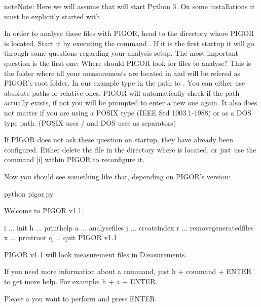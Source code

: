\documentclass[letterpaper,10pt,english]{sphinxmanual}
\begin{document}
\begin{sphinxadmonition}{note}{Note:}
Here we will assume that  will start Python 3. On some installations it must be explicitly started with .
\end{sphinxadmonition}

In order to analyse these files with PIGOR, head to the directory where PIGOR is located. Start it by executing the command . If it is the first startup it will go through some questions regarding your analysis setup. The most important question is the first one: Where should PIGOR look for files to analyse? This is the folder where all your measurements are located in and will be refered as PIGOR’s root folder. In our example type in the path to . You can either use absolute paths or relative ones. PIGOR will automatically check if the path actually exists, if not you will be prompted to enter a new one again. It also does not matter if you are using a POSIX type (IEEE Std 1003.1-1988) or as a DOS type path. (POSIX uses / and DOS uses as separators)

If PIGOR does not ask these question on startup, they have already been configured. Either delete the  file in the directory where  is located, or just use the command {[}i{]} within PIGOR to reconfigure it.

Now you should see something like that, depending on PIGOR’s version:

\begin{sphinxVerbatim}[commandchars=\\\{\}]
\PYGZdl{} python pigor.py

Welcome to PIGOR v1.1.

i ... init
h ... print\PYGZus{}help
a ... analyse\PYGZus{}files
j ... create\PYGZus{}index
r ... remove\PYGZus{}generated\PYGZus{}files
x ... print\PYGZus{}root
q ... quit PIGOR v1.1

PIGOR v1.1 will look  measurement files in D:easurements.

If you need more information about a command, just  h + \PYG{o}{[}command\PYG{o}{]} + \PYGZlt{}ENTER\PYGZgt{}
to get more help. For example: h + a + \PYGZlt{}ENTER\PYGZgt{}.

Please  a  you want to perform and press \PYGZlt{}ENTER\PYGZgt{}.
\end{sphinxVerbatim}
\end{document}
